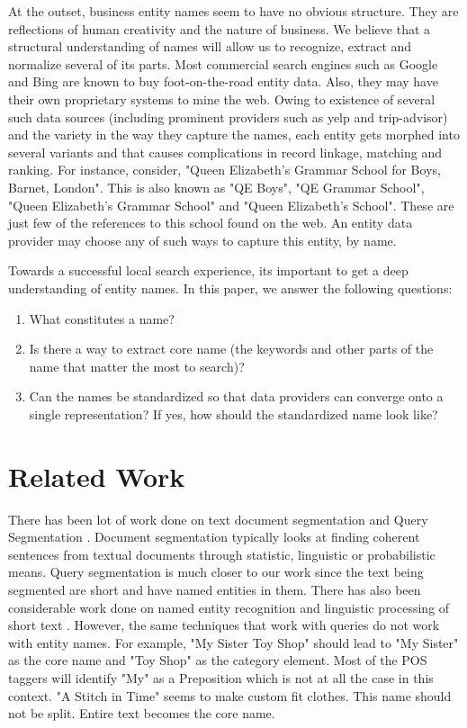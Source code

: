 \documentclass{acm_proc_article-sp}
\begin{document}
At the outset, business entity names seem to have no obvious structure. They are reflections of human creativity and the nature of business. We believe that a structural understanding of names will allow us to recognize, extract and normalize several of its parts. Most commercial search engines such as Google and Bing are known to buy foot-on-the-road entity data. Also, they may have their own proprietary systems to mine the web. Owing to existence of several such data sources (including prominent providers such as yelp and trip-advisor) and the variety in the way they capture the names, each entity gets morphed into several variants and that causes complications in record linkage, matching and ranking. For instance, consider, "Queen Elizabeth's Grammar School for Boys, Barnet, London". This is also known as "QE Boys", "QE Grammar School", "Queen Elizabeth's Grammar School" and "Queen Elizabeth's School". These are just few of the references to this school found on the web. An entity data provider may choose any of such ways to capture this entity, by name.

Towards a successful local search experience, its important to get a deep understanding of entity names. In this paper, we answer the following questions:\begin{enumerate}
\item What constitutes a name? 
\item Is there a way to extract core name (the keywords and other parts of the name that matter the most to search)?
\item Can the names be standardized so that data providers can converge onto a single representation? If yes, how should the standardized name look like?
\end{enumerate}	

\section{Related Work}
There has been lot of work done on text document segmentation\cite{Elliman:1990:RSC:78382.78394}\cite{Beeferman:1999:SMT:309497.309507}\cite{Huang:2003:AML:945486.945492} and Query Segmentation \cite{Hagen:2011:QSR:1963405.1963423}\cite{Hagen:2010:PNQ:1835449.1835621}\cite{Yu:2009:QSU:1557670.1557680}. 
Document segmentation typically looks at finding coherent sentences from textual documents through statistic, linguistic or probabilistic means. Query segmentation is much closer to our work since the text being segmented are short and have named entities in them. There has also been considerable work done on named entity recognition\cite{Guo:2009:NER:1571941.1571989}\cite{Li:2012:TNE:2348283.2348380} and linguistic processing of short text \cite{Murnane:2013:RLU:2487788.2488162}\cite{Taksa:2007:UWS:1262257.1262320}. However, the same techniques that work with queries do not work with entity names. For example, "My Sister Toy Shop" should lead to "My Sister" as the core name and "Toy Shop" as the category element. Most of the POS taggers will identify "My" as a Preposition which is not at all the case in this context. "A Stitch in Time" seems to make custom fit clothes. This name should not be split. Entire text becomes the core name.
\end{document}
